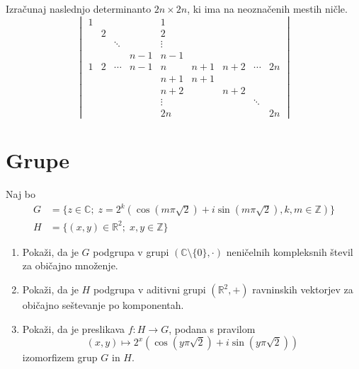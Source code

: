 \documentclass[a4paper,12pt]{article}
\begin{document}
Izračunaj naslednjo determinanto \(2n \times 2n\), ki ima na neoznačenih mestih ničle.
\[
    \begin{vmatrix}
        1 & & & & 1 & & & & \\
        & 2 & & & 2 & & & & \\
        & & \ddots & & \vdots & & & & \\
        & & & n-1 & n-1 & & & & \\
        1 & 2 & \cdots & n-1 & n & n+1 & n+2 & \cdots & 2n \\
        & & & & n+1 & n+1 & & & \\
        & & & & n+2 & & n+2 & & \\
        & & & & \vdots & & & \ddots & \\
        & & & & 2n & & & & 2n
    \end{vmatrix}
\]
%
%

\section*{Grupe}

Naj bo
\begin{align*}
    G &= \{z \in \mathbb{C};\; z = 2^k(\cos(m\pi\sqrt{2}) + i\sin(m\pi\sqrt{2}),k,m \in \mathbb{Z})\}\\
    H &= \{(x,y) \in \mathbb{R}^2;\;x,y \in \mathbb{Z}\}
\end{align*}
\begin{enumerate}
\item
Pokaži, da je \(G\) podgrupa v grupi $(\mathbb{C} \setminus \{0\},\cdot)$
neničelnih kompleksnih števil za običajno množenje.

\item
Pokaži, da je \(H\) podgrupa v aditivni grupi $(\mathbb{R}^2,+)$
ravninskih vektorjev za običajno seštevanje po komponentah.

\item
Pokaži, da je preslikava \(f:H\to G\), podana s pravilom
\[
    (x,y) \mapsto 2^x(\cos(y\pi\sqrt{2}) + i\sin(y\pi\sqrt{2}))
\]
izomorfizem grup \(G\) in \(H\).
\end{enumerate}
\end{document}
